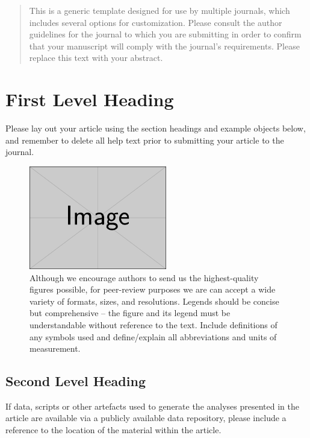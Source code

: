 \documentclass[alpha-refs]{wiley-article}
\begin{document}
\begin{abstract}
This is a generic template designed for use by multiple journals, which includes several options for customization. Please consult the author guidelines for the journal to which you are submitting in order to confirm that your manuscript will comply with the journal's requirements. Please replace this text with your abstract.

\end{abstract}

\section{First Level Heading}

Please lay out your article using the section headings and example objects below, and remember to delete all help text prior to submitting your article to the journal.

\begin{figure}[bt]
\centering
\includegraphics[width=6cm]{example-image-rectangle}
\caption{Although we encourage authors to send us the highest-quality figures possible, for peer-review purposes we are can accept a wide variety of formats, sizes, and resolutions. Legends should be concise but comprehensive – the figure and its legend must be understandable without reference to the text. Include definitions of any symbols used and define/explain all abbreviations and units of measurement.}
\end{figure}

\subsection{Second Level Heading}
If data, scripts or other artefacts used to generate the analyses presented in the article are available via a publicly available data repository, please include a reference to the location of the material within the article.
\end{document}
